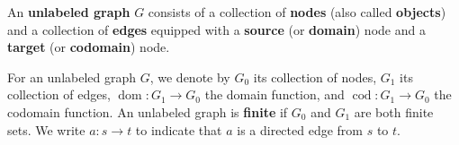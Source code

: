 \begin{definition}
    \label{def:graph:unlabeled}
    An \textbf{unlabeled graph} \( G \) consists of a collection of \textbf{nodes} (also called \textbf{objects}) and a collection of \textbf{edges} equipped with a \textbf{source} (or \textbf{domain}) node and a \textbf{target} (or \textbf{codomain}) node. 
    
    For an unlabeled graph \( G \), we denote by \( G_0 \) its collection of nodes, \( G_1 \) its collection of edges, \( \operatorname{dom}:G_1{\to}G_0 \) the domain function, and \( \operatorname{cod}:G_1{\to}G_0 \) the codomain function. An unlabeled graph is \textbf{finite} if \( G_0 \) and \( G_1 \) are both finite sets.
    We write \( a: s \to t \) to indicate that \( a \) is a directed edge from \( s \) to \( t \).
\end{definition}   